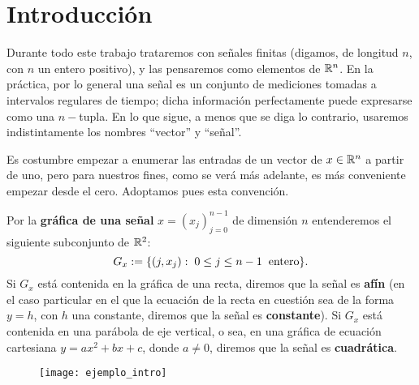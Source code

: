 \chapter{Introducción}
\label{chapter: introduccion}
Durante todo este trabajo trataremos con señales
finitas
(digamos, de
longitud $n$, con $n$
un entero positivo), y las pensaremos como elementos de $\mathbb{R}^{n}$.
En la práctica, por lo general
una señal es un conjunto de mediciones tomadas
a intervalos regulares de tiempo; dicha
información perfectamente puede expresarse como 
una $n-$tupla. En lo que sigue, a menos que se diga
lo contrario, usaremos indistintamente los nombres
``vector'' y ``señal''.

Es costumbre empezar
a enumerar las entradas de un vector
de $x \in \mathbb{R}^{n}$ a partir de uno, pero
para nuestros fines,
como se verá más adelante, es más 
conveniente empezar desde el cero.
Adoptamos pues esta convención.


\begin{defi}
\label{def: grafica senial}
Por la \textbf{gráfica de una señal} $x=(x_{j})_{j=0}^{n-1}$
de dimensión $n$ entenderemos
 el siguiente subconjunto de $\mathbb{R}^{2}$:
\[
G_{x} := 
\{ (j, x_{j} ) : \hspace{0.1cm} 0 \leq j \leq n-1
\hspace{0.2cm} \text{entero}\} .
\]
Si $G_{x}$ está contenida en la gráfica de una recta, diremos que la
señal es \textbf{afín}
(en el caso particular en el que
la ecuación de la recta en cuestión sea de la forma $y= h$,
con $h$ una constante,
diremos que la señal es
\textbf{constante}). Si  $G_{x}$ está contenida en 
una parábola de eje vertical, o sea, en una
gráfica de ecuación cartesiana
$y=ax^{2}+ bx +c$, donde $a \neq 0$, diremos 
que la señal es \textbf{cuadrática}.
\end{defi}


\begin{figure}[H]
	\texttt{[image: ejemplo\_intro]} 
 \end{figure}

